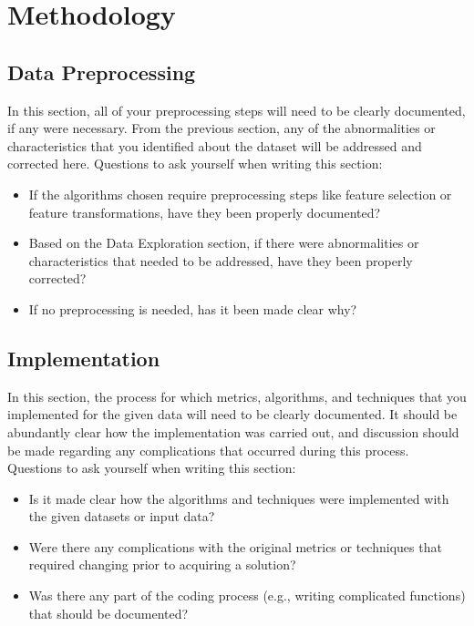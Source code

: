 \documentclass[twoside,openright,titlepage,numbers=noenddot,headinclude,%
               footinclude=true,cleardoublepage=empty,abstractoff,BCOR=5mm,%
               paper=a4,fontsize=11pt,ngerman,american]{scrreprt}
\numberwithin{theorem}{chapter}
\numberwithin{definition}{chapter}
\numberwithin{algorithm}{chapter}
\numberwithin{figure}{chapter}
\numberwithin{table}{chapter}
\numberwithin{equation}{chapter}
\begin{document}
\chapter*{Methodology}


\section*{Data Preprocessing}
In this section, all of your preprocessing steps will need to be clearly documented, if any were necessary. From the previous section, any of the abnormalities or characteristics that you identified about the dataset will be addressed and corrected here. Questions to ask yourself when writing this section:
\begin{itemize}%
\item If the algorithms chosen require preprocessing steps like feature selection or feature transformations, have they been properly documented?
\item Based on the Data Exploration section, if there were abnormalities or characteristics that needed to be addressed, have they been properly corrected?
\item If no preprocessing is needed, has it been made clear why?
\end{itemize}

\section*{Implementation}
In this section, the process for which metrics, algorithms, and techniques that you implemented for the given data will need to be clearly documented. It should be abundantly clear how the implementation was carried out, and discussion should be made regarding any complications that occurred during this process. Questions to ask yourself when writing this section:
\begin{itemize}%
\item Is it made clear how the algorithms and techniques were implemented with the given datasets or input data?
\item Were there any complications with the original metrics or techniques that required changing prior to acquiring a solution?
\item Was there any part of the coding process (e.g., writing complicated functions) that should be documented?
\end{itemize}
\end{document}
